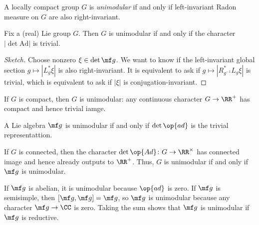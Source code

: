 \documentclass{article}
\begin{document}
\begin{definition}[unimodular]
	A locally compact group $G$ is \textit{unimodular} if and only if left-invariant Radon measure on $G$ are also right-invariant.
\end{definition}
\begin{proposition}
	Fix a (real) Lie group $G$. Then $G$ is unimodular if and only if the character $\left|\det\mathrm{Ad}\right|$ is trivial.
\end{proposition}
\begin{proof}[Sketch]
	Choose nonzero $\xi\in\det\mf g$. We want to know if the left-invariant global section $g\mapsto\left|L_g^*\xi\right|$ is also right-invariant. It is equivalent to ask if $g\mapsto\left|R_{g^{-1}}^*L_g\xi\right|$ is trivial, which is equivalent to ask if $\left|\xi\right|$ is conjugation-invariant.
\end{proof}
\begin{example}
	If $G$ is compact, then $G$ is unimodular: any continuous character $G\to\RR^+$ has compact and hence trivial iamge.
\end{example}
\begin{definition}
	A Lie algebra $\mf g$ is unimodular if and only if $\det\op{ad}$ is the trivial representattion.
\end{definition}
\begin{remark}
	If $G$ is connected, then the character $\det\op{Ad}\colon G\to\RR^\times$ has connected image and hence already outputs to $\RR^+$. Thus, $G$ is unimodular if and only if $\mf g$ is unimodular.
\end{remark}
\begin{example}
	If $\mf g$ is abelian, it is unimodular because $\op{ad}$ is zero. If $\mf g$ is semisimple, then $[\mf g,\mf g]=\mf g$, so $\mf g$ is unimodular because any character $\mf g\to\CC$ is zero. Taking the sum shows that $\mf g$ is unimodular if $\mf g$ is reductive.
\end{example}
\end{document}
